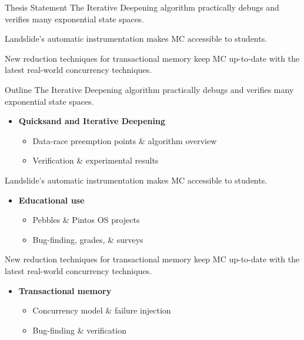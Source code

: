 \documentclass[xcolor=dvipsnames]{beamer}
\newcommand\hilight[2]{\color{#1}#2\color{black}}
\begin{document}
\begin{frame}{Thesis Statement}
	The Iterative Deepening algorithm %
	practically debugs and verifies many exponential state spaces.
	\vspace{4.54em}

	Landslide's automatic instrumentation makes MC accessible to students.
	\vspace{4.54em}

	New reduction techniques for transactional memory keep MC up-to-date
	with the latest real-world concurrency techniques.
	\vspace{4.54em}
\end{frame}
\begin{frame}{Outline}
	\hilight{gray}{The Iterative Deepening algorithm %
	practically debugs and verifies many exponential state spaces.} \\
	\begin{itemize}
		\item {\bf Quicksand and Iterative Deepening}
		\begin{itemize}
			\item Data-race preemption points \& algorithm overview
			\item Verification \& experimental results
		\end{itemize}
	\end{itemize}
	\hilight{gray}{Landslide's automatic instrumentation makes MC accessible to students.} \\
	\begin{itemize}
		\item {\bf Educational use}
		\begin{itemize}
			\item Pebbles \& Pintos OS projects
			\item Bug-finding, grades, \& surveys
		\end{itemize}
	\end{itemize}

	\hilight{gray}{New reduction techniques for transactional memory keep MC up-to-date
	with the latest real-world concurrency techniques.} \\
	\begin{itemize}
		\item {\bf Transactional memory}
		\begin{itemize}
			\item Concurrency model \& failure injection
			\item Bug-finding \& verification
		\end{itemize}
	\end{itemize}
\end{frame}
\end{document}
